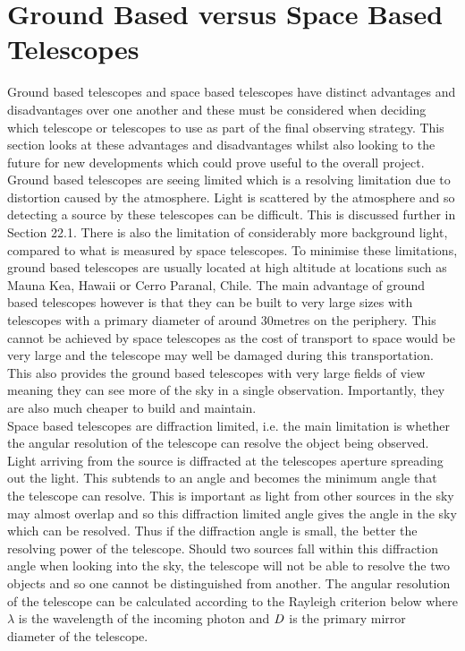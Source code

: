 \documentclass[pdf,color]{UoBnote}
\begin{document}
\section{Ground Based versus Space Based Telescopes}
Ground based telescopes and space based telescopes have distinct advantages and disadvantages over one another and these must be considered when deciding which telescope or telescopes to use as part of the final observing strategy. This section looks at these advantages and disadvantages whilst also looking to the future for new developments which could prove useful to the overall project.\\
\newline
Ground based telescopes are seeing limited which is a resolving limitation due to distortion caused by the atmosphere. Light is scattered by the atmosphere and so detecting a source by these telescopes can be difficult. This is discussed further in Section 22.1. There is also the limitation of considerably more background light, compared to what is measured by space telescopes. To minimise these limitations, ground based telescopes are usually located at high altitude at locations such as Mauna Kea, Hawaii or Cerro Paranal, Chile. The main advantage of ground based telescopes however is that they can be built to very large sizes with telescopes with a primary diameter of around 30metres on the periphery. This cannot be achieved by space telescopes as the cost of transport to space would be very large and the telescope may well be damaged during this transportation. This also provides the ground based telescopes with very large fields of view meaning they can see more of the sky in a single observation. Importantly, they are also much cheaper to build and maintain.\\
\newline
Space based telescopes are diffraction limited, i.e. the main limitation is whether the angular resolution of the telescope can resolve the object being observed. Light arriving from the source is diffracted at the telescopes aperture spreading out the light. This subtends to an angle and becomes the minimum angle that the telescope can resolve. This is important as light from other sources in the sky may almost overlap and so this diffraction limited angle gives the angle in the sky which can be resolved. Thus if the diffraction angle is small, the better the resolving power of the telescope. Should two sources fall within this diffraction angle when looking into the sky, the telescope will not be able to resolve the two objects and so one cannot be distinguished from another. The angular resolution of the telescope can be calculated according to the Rayleigh criterion below where $\lambda$ is the wavelength of the incoming photon and $\it{D}$ is the primary mirror diameter of the telescope.\\
\end{document}
